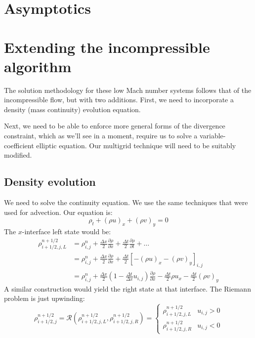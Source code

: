 \section{Asymptotics}



\section{Extending the incompressible algorithm}

The solution methodology for these low Mach number systems follows 
that of the incompressible flow, but with two additions.  First,
we need to incorporate a density (mass continuity) evolution equation.

Next, we need to be able to enforce more general forms of the 
divergence constraint, which as we'll see in a moment, require
us to solve a variable-coefficient elliptic equation.  Our
multigrid technique will need to be suitably modified.

\subsection{Density evolution}

We need to solve the continuity equation.  We use the same techniques
that were used for advection.  Our equation is:
\begin{equation}
\rho_t + (\rho u)_x + (\rho v)_y = 0
\end{equation}
The $x$-interface left state would be:
\begin{align}
\rho_{i+1/2,j,L}^{n+1/2} &= \rho_{i,j}^n + 
   \frac{\Delta x}{2} \frac{\partial \rho}{\partial x} +
   \frac{\Delta t}{2} \frac{\partial \rho}{\partial t} + \ldots \nonumber \\
%
 &= \rho_{i,j}^n + 
    \frac{\Delta x}{2} \frac{\partial \rho}{\partial x} +
    \frac{\Delta t}{2} \left [ -(\rho u)_x -(\rho v)_y \right ]_{i,j} \nonumber\\
%
 &= \rho_{i,j}^n + 
   \frac{\Delta x}{2} \left ( 1 - \frac{\Delta t}{\Delta x} u_{i,j} \right )
        \frac{\partial \rho}{\partial x}
   - \frac{\Delta t}{2} \rho u_x - \frac{\Delta t}{2} (\rho v)_y 
\end{align}
A similar construction would yield the right state at that interface. 
The Riemann problem is just upwinding:
\begin{equation}
\rho_{i+1/2,j}^{n+1/2} = \mathcal{R}(\rho_{i+1/2,j,L}^{n+1/2},
                                     \rho_{i+1/2,j,R}^{n+1/2}) =
  \left \{
  \begin{array}{cl}
     \rho_{i+1/2,j,L}^{n+1/2} & u_{i,j} > 0 \\
     \rho_{i+1/2,j,R}^{n+1/2} & u_{i,j} < 0 
  \end{array} \right .
\end{equation}
     



